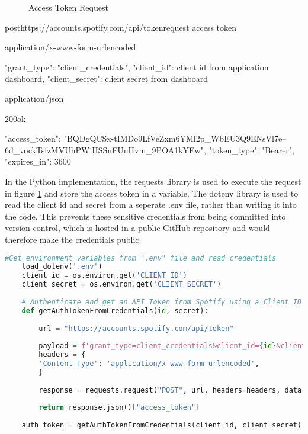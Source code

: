\begin{figure}[H]
    \caption{Access Token Request}
	\label{fig:Access Token Request}
\end{figure}
\begin{apiRoute}{post}{https://accounts.spotify.com/api/token}{request access token}
    \begin{routeRequest}{application/x-www-form-urlencoded}
        \begin{routeRequestBody}
{
    "grant_type": "client_credentials",
    "client_id": client id from application dashboard,
    "client_secret": client secret from dashboard
}
        \end{routeRequestBody}
    \end{routeRequest}
    \begin{routeResponse}{application/json}
        \begin{routeResponseItem}{200}{ok}
            \begin{routeResponseItemBody}
{
    "access_token": "BQDgQCSx-tIMDo9LfVeZxm6YMl2p_WbEU3Q9ENsVl7e--6d_vockTsfzMVUhPWiHSSnFUuHvm_9POA1kYEw",
    "token_type": "Bearer",
    "expires_in": 3600
}
            \end{routeResponseItemBody}
        \end{routeResponseItem}
    \end{routeResponse}
\end{apiRoute}

In the Python implementation, the requests library is used to execute the request in figure \ref{fig:Access Token Request}
and store the access token in a variable. The dotenv library is used to read the client id and secret from a seperate
.env file, rather than writing it into the code. This prevents these sensitive credentials from being committed
into version control, which is hosted in a public GitHub repository and would therefore make the credentials public.

\begin{lstlisting}[language=Python]
    #Get environment variables from ".env" file and read credentials
    load_dotenv('.env')
    client_id = os.environ.get('CLIENT_ID')
    client_secret = os.environ.get('CLIENT_SECRET')
    
    # Authenticate and get an API Token from Spotify using a Client ID and secret
    def getAuthTokenFromCredentials(id, secret):
    
        url = "https://accounts.spotify.com/api/token"
    
        payload = f'grant_type=client_credentials&client_id={id}&client_secret={secret}'
        headers = {
        'Content-Type': 'application/x-www-form-urlencoded',
        }
    
        response = requests.request("POST", url, headers=headers, data=payload)
    
        return response.json()["access_token"]
    
    auth_token = getAuthTokenFromCredentials(client_id, client_secret)
\end{lstlisting}

